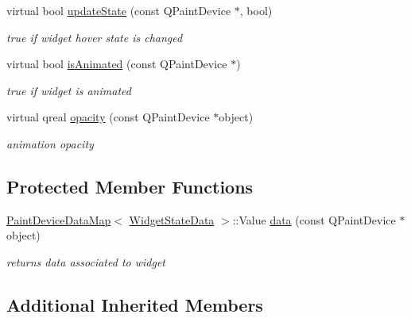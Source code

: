 \begin{DoxyCompactItemize}
\mbox{\label{class_tool_box_engine_aed4097d32dd755065b0866bf5ffb6cae}} 
virtual bool \hyperlink{class_tool_box_engine_aed4097d32dd755065b0866bf5ffb6cae}{update\+State} (const Q\+Paint\+Device $\ast$, bool)
\begin{DoxyCompactList}\small\item\em true if widget hover state is changed \end{DoxyCompactList}\item 
\mbox{\label{class_tool_box_engine_af9466975828707b12c4392162a27f5c5}} 
virtual bool \hyperlink{class_tool_box_engine_af9466975828707b12c4392162a27f5c5}{is\+Animated} (const Q\+Paint\+Device $\ast$)
\begin{DoxyCompactList}\small\item\em true if widget is animated \end{DoxyCompactList}\item 
\mbox{\label{class_tool_box_engine_ac8a8e6fa3bc039f680a16313c04bf19c}} 
virtual qreal \hyperlink{class_tool_box_engine_ac8a8e6fa3bc039f680a16313c04bf19c}{opacity} (const Q\+Paint\+Device $\ast$object)
\begin{DoxyCompactList}\small\item\em animation opacity \end{DoxyCompactList}\end{DoxyCompactItemize}
\subsection*{Protected Member Functions}
\begin{DoxyCompactItemize}
\item 
\mbox{\label{class_tool_box_engine_a6c031c13cc4bf34656771d08c4c3985a}} 
\hyperlink{class_paint_device_data_map}{Paint\+Device\+Data\+Map}$<$ \hyperlink{class_widget_state_data}{Widget\+State\+Data} $>$\+::Value \hyperlink{class_tool_box_engine_a6c031c13cc4bf34656771d08c4c3985a}{data} (const Q\+Paint\+Device $\ast$object)
\begin{DoxyCompactList}\small\item\em returns data associated to widget \end{DoxyCompactList}\end{DoxyCompactItemize}
\subsection*{Additional Inherited Members}


